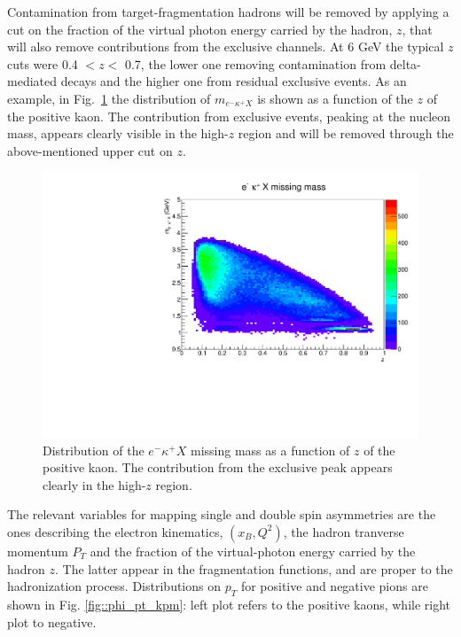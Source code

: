 Contamination from target-fragmentation hadrons will be removed by applying a cut on the fraction of the virtual photon energy carried by the hadron, $z$, that will also remove contributions from the exclusive channels. At 6 GeV the typical $z$ cuts were 0.4 $<z<$ 0.7, the lower one removing contamination from delta-mediated decays and the higher one from residual exclusive events.
As an example, in Fig.~\ref{fig::mx} the distribution of $m_{e^-\kappa^+X}$ is shown as a function of the $z$ of the positive kaon. The contribution from exclusive events, peaking at the nucleon mass, appears clearly visible in the high-$z$ region and will be removed through the above-mentioned upper cut on $z$.\\
%
%
%
\begin{figure}
\centering
\includegraphics[width=1.0\textwidth]{sidis/mmElKaPX.pdf}
\caption{\label{fig::mx} Distribution of the $e^-\kappa^+X$ missing mass as a function of $z$ of the positive kaon. The contribution from the exclusive peak appears clearly in the high-$z$ region.}
\end{figure}
%
%
The relevant variables for mapping single and double spin asymmetries are the ones describing the electron kinematics, $(x_B, Q^2)$, the hadron tranverse momentum $P_T$ and the fraction of the virtual-photon energy carried by the hadron $z$. The latter appear in the fragmentation functions, and are proper to the hadronization process.
Distributions on $p_T$ for positive and negative pions are shown in Fig. \ref{fig::phi_pt_kpm}: left plot refers to the positive kaons, while right plot to negative.
